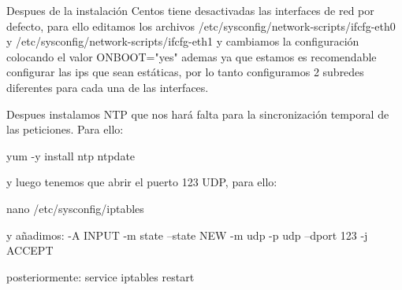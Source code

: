 Despues de la instalación Centos tiene desactivadas las interfaces de red por defecto, para ello editamos los archivos /etc/sysconfig/network-scripts/ifcfg-eth0 y /etc/sysconfig/network-scripts/ifcfg-eth1 y cambiamos la configuración colocando el valor ONBOOT="yes"  ademas ya que estamos es recomendable configurar las ips que sean estáticas, por lo tanto configuramos 2 subredes diferentes para cada una de las interfaces.




Despues instalamos NTP que nos hará falta para la sincronización temporal de las peticiones. Para ello:

yum -y install ntp ntpdate

y luego tenemos que abrir el puerto 123 UDP, para ello:

nano /etc/sysconfig/iptables

y añadimos: -A INPUT -m state --state NEW -m udp -p udp --dport 123 -j ACCEPT

posteriormente: service iptables restart






\clearpage


